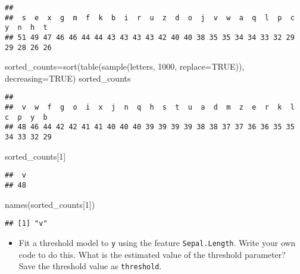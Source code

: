\documentclass[
]{article}
\newenvironment{Shaded}{\begin{snugshade}}{\end{snugshade}}
\newcommand{\AttributeTok}[1]{\textcolor[rgb]{0.77,0.63,0.00}{#1}}
\newcommand{\ConstantTok}[1]{\textcolor[rgb]{0.00,0.00,0.00}{#1}}
\newcommand{\DecValTok}[1]{\textcolor[rgb]{0.00,0.00,0.81}{#1}}
\newcommand{\FunctionTok}[1]{\textcolor[rgb]{0.00,0.00,0.00}{#1}}
\newcommand{\NormalTok}[1]{#1}
\newcommand{\OtherTok}[1]{\textcolor[rgb]{0.56,0.35,0.01}{#1}}
\providecommand{\tightlist}{%
  \setlength{\itemsep}{0pt}\setlength{\parskip}{0pt}}
\begin{document}
\begin{verbatim}
## 
##  s  e  x  g  m  f  k  b  i  r  u  z  d  o  j  v  w  a  q  l  p  c  y  n  h  t 
## 51 49 47 46 46 44 44 43 43 43 43 42 40 40 38 35 35 34 34 33 32 29 29 28 26 26
\end{verbatim}

\begin{Shaded}
\begin{Highlighting}[]
\NormalTok{sorted\_counts}\OtherTok{=}\FunctionTok{sort}\NormalTok{(}\FunctionTok{table}\NormalTok{(}\FunctionTok{sample}\NormalTok{(letters, }\DecValTok{1000}\NormalTok{, }\AttributeTok{replace=}\ConstantTok{TRUE}\NormalTok{)), }\AttributeTok{decreasing=}\ConstantTok{TRUE}\NormalTok{)}
\NormalTok{sorted\_counts}
\end{Highlighting}
\end{Shaded}

\begin{verbatim}
## 
##  v  w  f  g  o  i  x  j  n  q  h  s  t  u  a  d  m  z  e  r  k  l  c  p  y  b 
## 48 46 44 42 42 41 41 40 40 40 39 39 39 39 38 38 37 37 36 36 35 35 34 33 32 29
\end{verbatim}

\begin{Shaded}
\begin{Highlighting}[]
\NormalTok{sorted\_counts[}\DecValTok{1}\NormalTok{]}
\end{Highlighting}
\end{Shaded}

\begin{verbatim}
##  v 
## 48
\end{verbatim}

\begin{Shaded}
\begin{Highlighting}[]
\FunctionTok{names}\NormalTok{(sorted\_counts[}\DecValTok{1}\NormalTok{])}
\end{Highlighting}
\end{Shaded}

\begin{verbatim}
## [1] "v"
\end{verbatim}

\begin{itemize}
\tightlist
\item
  Fit a threshold model to \texttt{y} using the feature
  \texttt{Sepal.Length}. Write your own code to do this. What is the
  estimated value of the threshold parameter? Save the threshold value
  as \texttt{threshold}.
\end{itemize}
\end{document}
